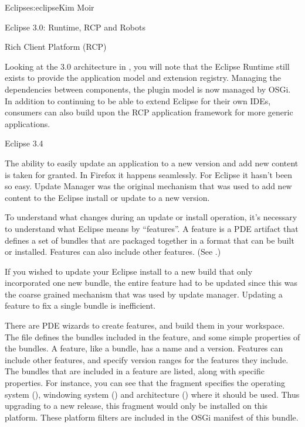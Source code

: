 \begin{aosachapter}{Eclipse}{s:eclipse}{Kim Moir}
\begin{aosasect1}{Eclipse 3.0: Runtime, RCP and Robots}
\begin{aosasect2}{Rich Client Platform (RCP)}

Looking at the 3.0 architecture in , you will
note that the Eclipse Runtime still exists to provide the application
model and extension registry.  Managing the dependencies between
components, the plugin model is now managed by OSGi. In addition
to continuing to be able to extend Eclipse for their own IDEs,
consumers can also build upon the RCP application framework for more
generic applications.

\end{aosasect2}

\end{aosasect1}

\begin{aosasect1}{Eclipse 3.4}

The ability to easily update an application to a new version and add
new content is taken for granted. In Firefox it happens seamlessly.
For Eclipse it hasn't been so easy. Update Manager was the original
mechanism that was used to add new content to the Eclipse install or
update to a new version.

To understand what changes during an update or install operation,
it's necessary to understand what Eclipse means by ``features''.
A feature is a PDE artifact that defines a set
of bundles that are packaged together in a format that can be built or
installed. Features can also include other features. (See
.)


If you wished to update your Eclipse install to a new build that only
incorporated one new bundle, the entire feature had to be updated
since this was the coarse grained mechanism that was used by update
manager.  Updating a feature to fix a single bundle is inefficient.

There are PDE wizards to create features, and build them in your
workspace.  The  file defines the bundles included
in the feature, and some simple properties of the bundles. A feature,
like a bundle, has a name and a version. Features can include other
features, and specify version ranges for the features they
include. The bundles that are included in a feature are listed, along
with specific properties. For instance, you can see that the
 fragment specifies the operating
system (), windowing system () and architecture
() where it should be used. Thus upgrading to a new
release, this fragment would only be installed on this platform. These
platform filters are included in the OSGi manifest of this bundle.


\end{aosasect1}
\end{aosachapter}
